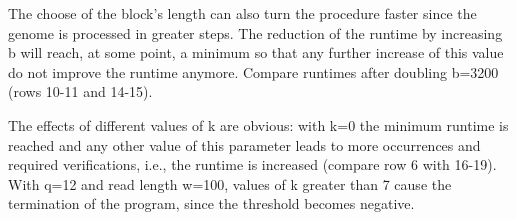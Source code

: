 \documentclass[11pt, notitlepage]{scrartcl}
\begin{document}
The choose of the block's length can also turn the procedure faster since the genome is processed in greater steps. The reduction of the runtime by increasing b will reach, at some point, a minimum so that any further increase of this value do not improve the runtime anymore. Compare runtimes after doubling b=3200 (rows 10-11 and 14-15).

The effects of different values of k are obvious: with k=0 the minimum runtime is reached and any other value of this parameter leads to more occurrences and required verifications, i.e., the runtime is increased (compare row 6 with 16-19). With q=12 and read length w=100, values of k greater than 7 cause the termination of the program, since the threshold becomes negative.


\end{document}

